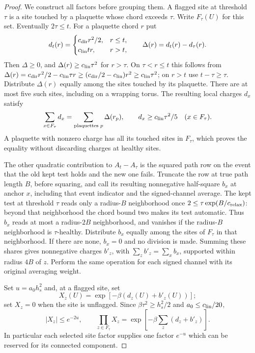 \begin{proof}
We construct all factors before grouping them. A flagged site at
threshold $\tau$ is a site touched by a plaquette whose chord exceeds
$\tau$. Write $F_\tau(U)$ for this set. Eventually $2\tau\le t$.
For a plaquette chord $r$ put
\[
 d_t(r)=\begin{cases}c_{\rm dir}r^2/2,&r\le t,\\
                     c_{\rm lin}tr,&r>t,\end{cases}
 \qquad \Delta(r)=d_t(r)-d_\tau(r).
\]
Then $\Delta\ge0$, and $\Delta(r)\ge c_{\rm lin}\tau^2$ for
$r>\tau$. On $\tau<r\le t$ this follows from
$\Delta(r)=c_{\rm dir}r^2/2-c_{\rm lin}\tau r
\ge(c_{\rm dir}/2-c_{\rm lin})r^2\ge c_{\rm lin}\tau^2$;
on $r>t$ use $t-\tau\ge\tau$. Distribute $\Delta(r)$ equally among the sites
touched by its plaquette. There are at most five such sites, including
on a wrapping torus. The resulting local charges $d_x$ satisfy
\[
 \sum_{x\in F_\tau}d_x=\sum_{\text{plaquettes }p}\Delta(r_p),
 \qquad d_x\ge c_{\rm lin}\tau^2/5\quad(x\in F_\tau).
\]
A plaquette with nonzero charge has all its touched sites in $F_\tau$,
which proves the equality without discarding charges at healthy sites.

The other quadratic contribution to $A_t-A_\tau$ is the squared
path row on the event that the old kept test holds and the new one
fails. Truncate the row at true path length $B$, before squaring,
and call its resulting nonnegative half-square $b_x$ at anchor $x$,
including that event indicator and the signed-channel average.
The kept test at threshold $\tau$ reads only a radius-$B$ neighborhood
once $2\le\tau\exp(B/c_{\rm relax})$: beyond that neighborhood the
chord bound two makes its test automatic. Thus $b_x$ reads at most
a radius-$2B$ neighborhood, and vanishes if the radius-$B$
neighborhood is $\tau$-healthy. Distribute $b_x$ equally among the
sites of $F_\tau$ in that neighborhood. If there are none, $b_x=0$
and no division is made. Summing these shares gives nonnegative
charges $b'_z$, with $\sum_zb'_z=\sum_xb_x$, supported within radius
$4B$ of $z$. Perform the same operation for each signed channel with
its original averaging weight.

Set $u=a_0h_s^2$ and, at a flagged site, set
\[
 X_z(U)=\exp[-\beta(d_z(U)+b'_z(U))];
\]
set $X_z=0$ when the site is unflagged. Since
$\beta\tau^2\ge h_s^2/2$ and $a_0\le c_{\rm lin}/20$,
\begin{equation}\label{eq:restart-endpoint-signal}
 |X_z|\le e^{-2u},\qquad
 \prod_{z\in F_\tau}X_z
       =\exp[-\beta\sum_z(d_z+b'_z)].
\end{equation}
In particular each selected site factor supplies one factor $e^{-u}$
which can be reserved for its connected component.


\end{proof}
